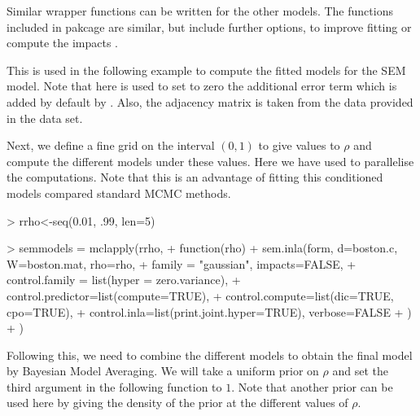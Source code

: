 \documentclass[article]{jss}
\begin{document}
Similar wrapper functions can be written for the other models. The functions
included in pakcage  are similar, but include further options,
to improve fitting or compute the impacts 
\citep[see,][for details]{Bivandetal:2013}.

This is used in the following example to compute the fitted models
for the SEM model. Note that here  is used to set
to zero the additional error term which is added by default by .
Also, the adjacency matrix is taken from the data provided in the 
data set.

\begin{Schunk}
\end{Schunk}

Next, we define a fine grid on the interval $(0,1)$ to give values
to $\rho$ and compute the different models under these values. Here
we have used  to parallelise the computations. Note
that this is an advantage of fitting this conditioned models compared 
standard MCMC methods.


\begin{Schunk}
\begin{Sinput}
> rrho<-seq(0.01, .99, len=5)
\end{Sinput}
\end{Schunk}
\begin{Schunk}
\begin{Sinput}
> semmodels = mclapply(rrho,
+         function(rho) {
+                 sem.inla(form, d=boston.c, W=boston.mat, rho=rho,
+                         family = "gaussian", impacts=FALSE,
+                         control.family = list(hyper = zero.variance),
+                         control.predictor=list(compute=TRUE),
+                         control.compute=list(dic=TRUE, cpo=TRUE),
+                         control.inla=list(print.joint.hyper=TRUE), verbose=FALSE
+                 )
+         })
\end{Sinput}
\end{Schunk}

\noindent
Following this, we need to combine the different models
to obtain the final model by Bayesian Model Averaging. We will take
a uniform prior on $\rho$ and set the third argument in the following
function to $1$. Note that another prior can be used here by giving
the density of the prior at the different values of $\rho$.
\end{document}
